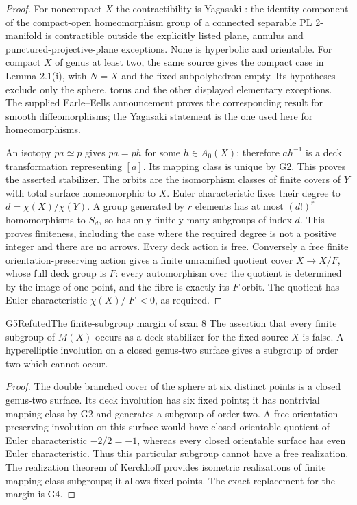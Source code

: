 \begin{proof}
For noncompact $X$ the contractibility is
Yagasaki \cite[Theorem 1.1(ii)]{G_Yagasaki}: the identity component of
the compact-open homeomorphism group of a connected separable PL
2-manifold is contractible outside the explicitly listed plane,
annulus and punctured-projective-plane exceptions. None is hyperbolic
and orientable. For compact $X$ of genus at least two, the same source
gives the compact case in Lemma 2.1(i), with $N=X$ and the fixed
subpolyhedron empty. Its hypotheses exclude only the sphere, torus
and the other displayed elementary exceptions. The supplied
Earle--Eells announcement \cite[Theorem 1(c)]{G_EarleEells} proves the
corresponding result for smooth diffeomorphisms; the Yagasaki statement
is the one used here for homeomorphisms.

An isotopy $p a\simeq p$ gives $p a=p h$ for some $h\in A_0(X)$;
therefore $a h^{-1}$ is a deck transformation representing $[a]$.
Its mapping class is unique by G2. This proves the asserted stabilizer.
The orbits are the isomorphism classes of finite covers of $Y$ with
total surface homeomorphic to $X$. Euler characteristic fixes their
degree to $d=\chi(X)/\chi(Y)$. A group generated by $r$ elements has
at most $(d!)^r$ homomorphisms to $S_d$, so has only finitely many
subgroups of index $d$. This proves finiteness, including the case
where the required degree is not a positive integer and there are no
arrows. Every deck action is free. Conversely a free finite
orientation-preserving action gives a finite unramified quotient cover
$X\to X/F$, whose full deck group is $F$: every automorphism over the
quotient is determined by the image of one point, and the fibre is
exactly its $F$-orbit. The quotient has Euler characteristic
$\chi(X)/|F|<0$, as required.
\end{proof}

\begin{result}{G5}{Refuted}{The finite-subgroup margin of scan 8}
The assertion that every finite subgroup of $M(X)$ occurs as a deck
stabilizer for the fixed source $X$ is false. A hyperelliptic involution
on a closed genus-two surface gives a subgroup of order two which
cannot occur.
\end{result}
\begin{proof}
The double branched cover of the sphere at six distinct points is a
closed genus-two surface. Its deck involution has six fixed points;
it has nontrivial mapping class by G2 and generates a subgroup of
order two. A free orientation-preserving involution on this surface
would have closed orientable quotient of Euler characteristic
$-2/2=-1$, whereas every closed orientable surface has even Euler
characteristic. Thus this particular subgroup cannot have a free
realization. The realization theorem of Kerckhoff
\cite[Theorem 1]{G_Kerckhoff}
provides isometric realizations of finite mapping-class subgroups;
it allows fixed points. The exact replacement for the margin is G4.
\end{proof}

